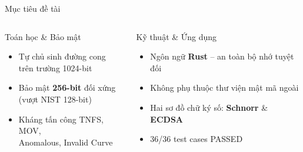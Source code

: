 \begin{frame}{Mục tiêu đề tài}
  \begin{columns}[t]
      \begin{block}{Toán học \& Bảo mật}
        \begin{itemize}
          \item Tự chủ sinh đường cong\\trên trường 1024-bit
          \item Bảo mật \textbf{256-bit} đối xứng\\(vượt NIST 128-bit)
          \item Kháng tấn công TNFS, MOV,\\Anomalous, Invalid Curve
        \end{itemize}
      \end{block}
      \begin{block}{Kỹ thuật \& Ứng dụng}
        \begin{itemize}
          \item Ngôn ngữ \textbf{Rust} -- an toàn bộ nhớ tuyệt đối
          \item Không phụ thuộc thư viện mật mã ngoài
          \item Hai sơ đồ chữ ký số: \textbf{Schnorr} \& \textbf{ECDSA}
          \item 36/36 test cases PASSED
        \end{itemize}
      \end{block}
  \end{columns}
\end{frame}
